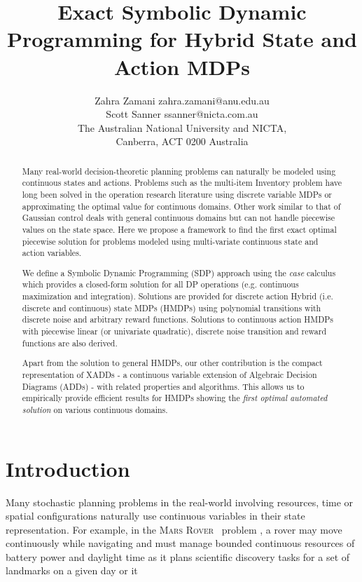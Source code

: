 \documentclass[twoside,11pt]{article}
\newcommand{\MarsRover}{\textsc{Mars Rover }}
\begin{document}
\title{Exact Symbolic Dynamic Programming for Hybrid State and Action MDPs}

\author{\name Zahra Zamani \email zahra.zamani@anu.edu.au \\
       \name Scott Sanner \email ssanner@nicta.com.au \\
       \addr The Australian National University and NICTA,\\
       Canberra, ACT 0200 Australia       
}

\maketitle


\begin{abstract}
Many real-world decision-theoretic planning problems can naturally be modeled using continuous states and actions. Problems such as the multi-item Inventory problem \cite{Scarf_Karlin58} have long been solved in the operation research literature using discrete variable MDPs or approximating the optimal value for continuous domains. Other work similar to that of Gaussian control deals with general continuous domains but can not handle piecewise values on the state space. Here we propose a framework to find the first exact optimal piecewise solution for problems modeled using multi-variate continuous state and action variables.

We define a Symbolic Dynamic Programming (SDP) approach using the \emph{case} calculus which provides a closed-form solution for all DP operations (e.g. continuous maximization and integration). Solutions are provided for discrete action Hybrid (i.e. discrete and continuous) state MDPs (HMDPs) using polynomial transitions with discrete noise and arbitrary reward functions. Solutions to continuous action HMDPs with piecewise linear (or univariate quadratic), discrete noise transition and reward functions are also derived. 

Apart from the solution to general HMDPs, our other contribution is the compact representation of XADDs - a continuous variable extension of Algebraic Decision Diagrams (ADDs) - with related properties and algorithms. This allows us to empirically provide efficient results for HMDPs showing the \emph{first optimal automated solution} on various continuous domains. 
\end{abstract}

\section{Introduction}
\label{Introduction}
Many stochastic planning problems in the real-world involving resources, time or spatial configurations naturally use continuous variables in their state representation.  For example, in the \MarsRover\ problem \cite{bresina02}, a rover may move continuously while navigating and must manage bounded continuous resources of battery power and daylight time as it plans scientific discovery tasks for a set of landmarks on a given day or it  
\end{document}
